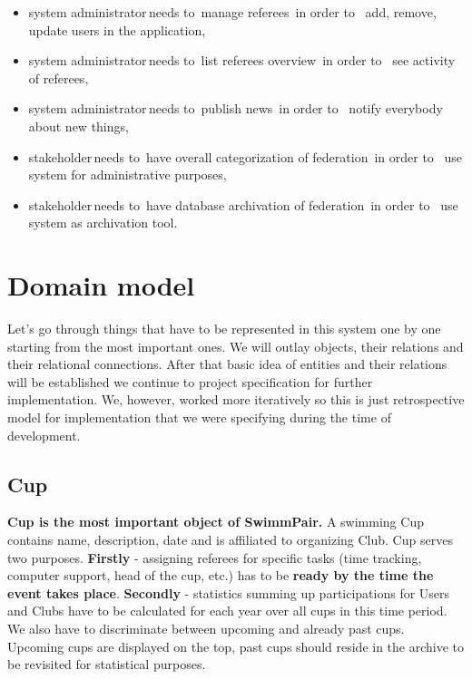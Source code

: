 \begin{itemize}
    \item \lbrack system administrator\rbrack \,needs to\, \lbrack manage referees\rbrack \, in order to \, \lbrack add, remove, update users in the application\rbrack,
    \item \lbrack system administrator\rbrack \,needs to\, \lbrack list referees overview\rbrack \, in order to \, \lbrack see activity of referees\rbrack,
    \item \lbrack system administrator\rbrack \,needs to\, \lbrack publish news\rbrack \, in order to \, \lbrack notify everybody about new things\rbrack,
    \item \lbrack stakeholder\rbrack \,needs to\, \lbrack have overall categorization of federation\rbrack \, in order to \, \lbrack use system for administrative purposes\rbrack,
    \item \lbrack stakeholder\rbrack \,needs to\, \lbrack have database archivation of federation\rbrack \, in order to \, \lbrack use system as archivation tool\rbrack.
  \end{itemize}
\section{Domain model}
Let's go through things that have to be represented in this system one by one starting from the most important ones. We will outlay  objects, their relations and their relational connections. After that basic idea of entities and their relations will be established we continue to project specification for further implementation. We, however, worked more iteratively so this is just retrospective model for implementation that we were specifying during the time of development. 
\par
\subsection*{Cup}
\textbf{Cup is the most important object of SwimmPair.} A swimming Cup contains name, description, date and is affiliated to organizing Club. Cup serves two purposes. \textbf{Firstly} - assigning referees for specific tasks (time tracking, computer support, head of the cup, etc.) has to be \textbf{ready by the time the event takes place}. \textbf{Secondly} - statistics summing up participations for Users and Clubs have to be calculated for each year over all cups in this time period. We also have to discriminate between upcoming and already past cups. Upcoming cups are displayed on the top, past cups should reside in the archive to be revisited for statistical purposes.
